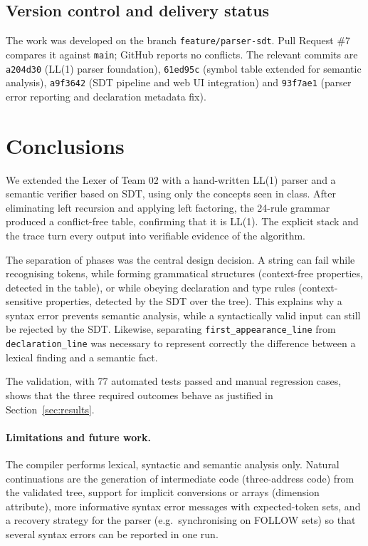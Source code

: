 \documentclass[11pt,a4paper]{article}
\begin{document}
\subsection{Version control and delivery status}
The work was developed on the branch \texttt{feature/parser-sdt}. Pull Request \#7 compares it against \texttt{main}; GitHub reports no conflicts. The relevant commits are \texttt{a204d30} (LL(1) parser foundation), \texttt{61ed95c} (symbol table extended for semantic analysis), \texttt{a9f3642} (SDT pipeline and web UI integration) and \texttt{93f7ae1} (parser error reporting and declaration metadata fix).

\section{Conclusions}
\label{sec:conclusions}
We extended the Lexer of Team 02 with a hand-written LL(1) parser and a semantic verifier based on SDT, using only the concepts seen in class. After eliminating left recursion and applying left factoring, the 24-rule grammar produced a conflict-free table, confirming that it is LL(1). The explicit stack and the trace turn every output into verifiable evidence of the algorithm.

The separation of phases was the central design decision. A string can fail while recognising tokens, while forming grammatical structures (context-free properties, detected in the table), or while obeying declaration and type rules (context-sensitive properties, detected by the SDT over the tree). This explains why a syntax error prevents semantic analysis, while a syntactically valid input can still be rejected by the SDT. Likewise, separating \texttt{first\_appearance\_line} from \texttt{declaration\_line} was necessary to represent correctly the difference between a lexical finding and a semantic fact.

The validation, with 77 automated tests passed and manual regression cases, shows that the three required outcomes behave as justified in Section~\ref{sec:results}.

\paragraph{Limitations and future work.} The compiler performs lexical, syntactic and semantic analysis only. Natural continuations are the generation of intermediate code (three-address code) from the validated tree, support for implicit conversions or arrays (dimension attribute), more informative syntax error messages with expected-token sets, and a recovery strategy for the parser (e.g.\ synchronising on FOLLOW sets) so that several syntax errors can be reported in one run.
\end{document}
